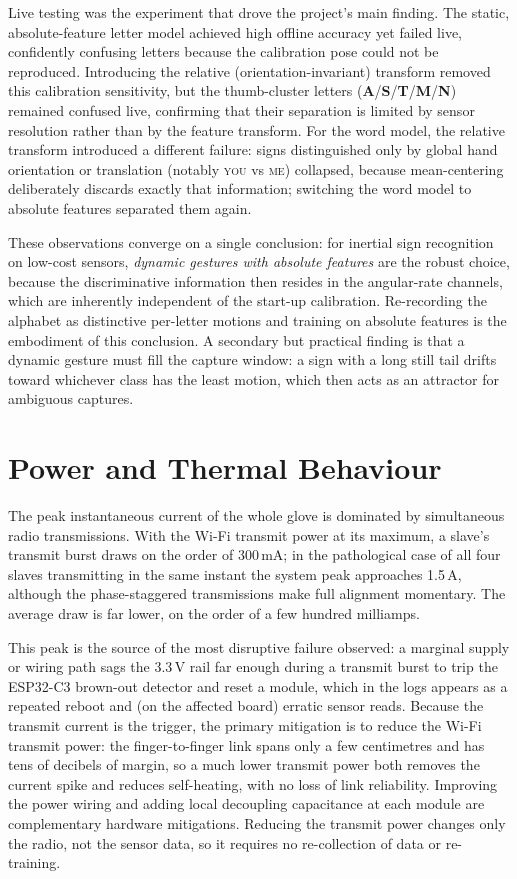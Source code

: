 Live testing was the experiment that drove the project's main finding. The
static, absolute-feature letter model achieved high offline accuracy yet failed
live, confidently confusing letters because the calibration pose could not be
reproduced. Introducing the relative (orientation-invariant) transform removed
this calibration sensitivity, but the thumb-cluster letters
(\textbf{A}/\textbf{S}/\textbf{T}/\textbf{M}/\textbf{N}) remained confused
live, confirming that their separation is limited by sensor resolution rather
than by the feature transform. For the word model, the relative transform
introduced a different failure: signs distinguished only by global hand
orientation or translation (notably \textsc{you} vs \textsc{me}) collapsed,
because mean-centering deliberately discards exactly that information; switching
the word model to absolute features separated them again.

These observations converge on a single conclusion: for inertial sign
recognition on low-cost sensors, \emph{dynamic gestures with absolute features}
are the robust choice, because the discriminative information then resides in
the angular-rate channels, which are inherently independent of the start-up
calibration. Re-recording the alphabet as distinctive per-letter motions and
training on absolute features is the embodiment of this conclusion. A secondary
but practical finding is that a dynamic gesture must fill the capture window: a
sign with a long still tail drifts toward whichever class has the least motion,
which then acts as an attractor for ambiguous captures.

\section{Power and Thermal Behaviour}

The peak instantaneous current of the whole glove is dominated by simultaneous
radio transmissions. With the Wi-Fi transmit power at its maximum, a slave's
transmit burst draws on the order of 300\,mA; in the pathological case of all
four slaves transmitting in the same instant the system peak approaches
1.5\,A, although the phase-staggered transmissions make full alignment
momentary. The average draw is far lower, on the order of a few hundred
milliamps.

This peak is the source of the most disruptive failure observed: a marginal
supply or wiring path sags the 3.3\,V rail far enough during a transmit burst to
trip the ESP32-C3 brown-out detector and reset a module, which in the logs
appears as a repeated reboot and (on the affected board) erratic sensor reads.
Because the transmit current is the trigger, the primary mitigation is to
reduce the Wi-Fi transmit power: the finger-to-finger link spans only a few
centimetres and has tens of decibels of margin, so a much lower transmit power
both removes the current spike and reduces self-heating, with no loss of link
reliability. Improving the power wiring and adding local decoupling capacitance
at each module are complementary hardware mitigations. Reducing the transmit
power changes only the radio, not the sensor data, so it requires no
re-collection of data or re-training.

